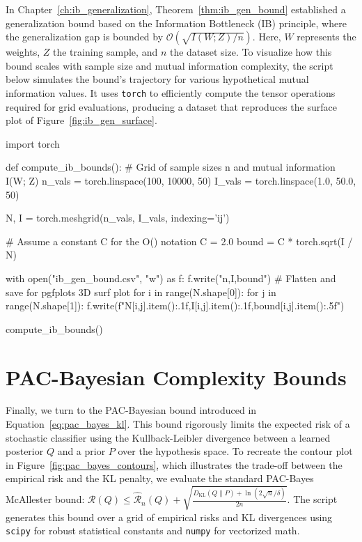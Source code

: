 In Chapter~\ref{ch:ib_generalization}, Theorem~\ref{thm:ib_gen_bound} established a generalization bound based on the Information Bottleneck (IB) principle, where the generalization gap is bounded by $\mathcal{O}(\sqrt{I(W; Z) / n})$. Here, $W$ represents the weights, $Z$ the training sample, and $n$ the dataset size. To visualize how this bound scales with sample size and mutual information complexity, the script below simulates the bound's trajectory for various hypothetical mutual information values. It uses \texttt{torch} to efficiently compute the tensor operations required for grid evaluations, producing a dataset that reproduces the surface plot of Figure~\ref{fig:ib_gen_surface}.

\begin{pycode}
import torch

def compute_ib_bounds():
    # Grid of sample sizes n and mutual information I(W; Z)
    n_vals = torch.linspace(100, 10000, 50)
    I_vals = torch.linspace(1.0, 50.0, 50)
    
    N, I = torch.meshgrid(n_vals, I_vals, indexing='ij')
    
    # Assume a constant C for the O() notation
    C = 2.0
    bound = C * torch.sqrt(I / N)
    
    with open("ib_gen_bound.csv", "w") as f:
        f.write("n,I,bound\n")
        # Flatten and save for pgfplots 3D surf plot
        for i in range(N.shape[0]):
            for j in range(N.shape[1]):
                f.write(f"{N[i,j].item():.1f},{I[i,j].item():.1f},{bound[i,j].item():.5f}\n")

compute_ib_bounds()
\end{pycode}

\section{PAC-Bayesian Complexity Bounds}

Finally, we turn to the PAC-Bayesian bound introduced in Equation~\ref{eq:pac_bayes_kl}. This bound rigorously limits the expected risk of a stochastic classifier using the Kullback-Leibler divergence between a learned posterior $Q$ and a prior $P$ over the hypothesis space. To recreate the contour plot in Figure~\ref{fig:pac_bayes_contours}, which illustrates the trade-off between the empirical risk and the KL penalty, we evaluate the standard PAC-Bayes McAllester bound: $\mathcal{R}(Q) \leq \hat{\mathcal{R}}_n(Q) + \sqrt{\frac{D_{\text{KL}}(Q \| P) + \ln(2\sqrt{n}/\delta)}{2n}}$. The script generates this bound over a grid of empirical risks and KL divergences using \texttt{scipy} for robust statistical constants and \texttt{numpy} for vectorized math.

